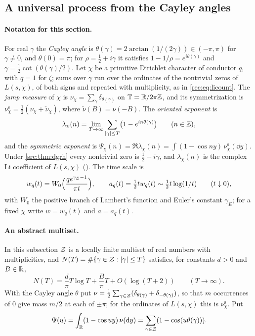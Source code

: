 \subsection{A universal process from the Cayley angles}\label{li:sec:univ}

\paragraph{Notation for this section.} For real $\gamma$ the \emph{Cayley angle} is
$\theta(\gamma)=2\arctan(1/(2\gamma))\in(-\pi,\pi)$ for $\gamma\ne0$, and $\theta(0)=\pi$; for
$\rho=\frac12+i\gamma$ it satisfies $1-1/\rho=e^{i\theta(\gamma)}$ and $\gamma=\frac12\cot(\theta(\gamma)/2)$.
Let $\chi$ be a primitive Dirichlet character of conductor $q$, with $q=1$ for $\zeta$; sums over
$\gamma$ run over the ordinates of the nontrivial zeros of $L(s,\chi)$, of both signs and repeated
with multiplicity, as in \eqref{rec:eq:licount}. The \emph{jump measure} of $\chi$ is
$\nu_\chi=\sum_\gamma\delta_{\theta(\gamma)}$ on $\mathbb T=\mathbb{R}/2\pi\mathbb{Z}$,
and its symmetrization is $\nu^{\mathrm s}_\chi=\frac12(\nu_\chi+\check\nu_\chi)$, where
$\check\nu(B)=\nu(-B)$. The \emph{oriented exponent} is
\[
 \lambda_\chi(n)=\lim_{T\to\infty}\sum_{\lvert\gamma\rvert\le T}\bigl(1-e^{in\theta(\gamma)}\bigr)\qquad(n\in\mathbb{Z}),
\]
and the \emph{symmetric exponent} is
$\Psi_\chi(n)=\Re\lambda_\chi(n)=\int(1-\cos ny)\,\nu^{\mathrm s}_\chi(\dd y)$. Under
\cref{src:thm:dgrh} every nontrivial zero is $\frac12+i\gamma$, and $\lambda_\chi(n)$ is the complex
Li coefficient of $L(s,\chi)$ (\stG). The time scale is
\[
 w_q(t)=W_0\Bigl(\frac{qe^{\gamma_E-1}}{\pi t}\Bigr),\qquad a_q(t)=\tfrac12tw_q(t)\sim\tfrac12t\log(1/t)
 \qquad(t\downarrow0),
\]
with $W_0$ the positive branch of Lambert's function and Euler's constant $\gamma_E$; for a fixed
$\chi$ write $w=w_q(t)$ and $a=a_q(t)$.

\paragraph{An abstract multiset.} In this subsection $\mathcal{Z}$ is a locally finite multiset of real numbers with multiplicities, and
$N(T)=\#\{\gamma\in\mathcal{Z}:\lvert\gamma\rvert\le T\}$ satisfies, for constants $d>0$ and $B\in\mathbb{R}$,
\begin{equation}\label{li:eq:count}
 N(T)=\frac d\pi T\log T+\frac B\pi T+O(\log(T+2))\qquad(T\to\infty).
\end{equation}
With the Cayley angle $\theta$ put
$\nu=\frac12\sum_{\gamma\in\mathcal{Z}}(\delta_{\theta(\gamma)}+\delta_{-\theta(\gamma)})$, so that $m$ occurrences
of $0$ give mass $m/2$ at each of $\pm\pi$; for the ordinates of $L(s,\chi)$ this is
$\nu^{\mathrm s}_\chi$. Put
\begin{equation}\label{li:eq:symbol}
 \Psi(u)=\int_{\mathbb{R}}(1-\cos uy)\,\nu(\mathrm{d} y)=\sum_{\gamma\in\mathcal{Z}}(1-\cos(u\theta(\gamma))).
\end{equation}


